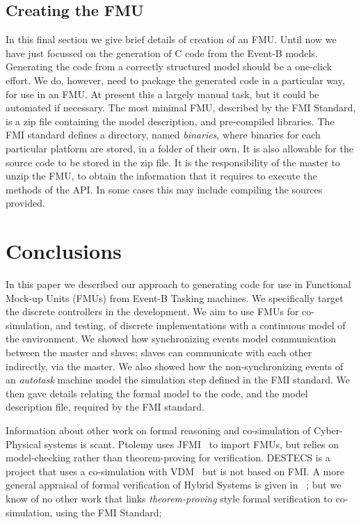 \documentclass{llncs}%
\begin{document}
\subsection{Creating the FMU}    
In this final section we give brief details of creation of an FMU. Until now we have just focussed on the generation of C code from the Event-B models. Generating the code from a correctly  structured model should be a one-click effort. We do, however, need to package the generated code in a particular way, for use in an FMU. At present this a largely manual task, but it could be automated if necessary. The most minimal FMU, described by the FMI Standard, is a zip file containing the model description, and pre-compiled libraries. The FMI standard defines a directory, named  \emph{binaries}, where binaries for each particular platform are stored, in a folder of their own. It is also allowable for the source code to be stored in the zip file. It is the responsibility of the master to unzip the FMU, to obtain the information that it requires to execute the methods of the API. In some cases this may include compiling the sources provided. 
%
\vspace*{-0.3cm}
\section{Conclusions}\label{conclusion}
In this paper we described our approach to generating code for use in Functional Mock-up Units (FMUs) from Event-B Tasking machines. We specifically target the discrete controllers in the development. We aim to use FMUs for co-simulation, and testing, of discrete implementations with a continuous model of the environment. We showed how synchronizing events model communication between the master and slaves; slaves can communicate with each other indirectly, via the master. We also showed how the non-synchronizing events of an \emph{autotask} machine model the simulation step defined in the FMI standard. We then gave details relating the formal model to the code, and the model description file, required by the FMI standard.

Information about other work on formal reasoning and co-simulation of Cyber-Physical systems is scant. Ptolemy uses JFMI~\cite{jfmi} to import FMUs, but relies on model-checking rather than theorem-proving for verification. DESTECS is a project that uses a co-simulation with VDM~\cite{destecs} but is not based on FMI. A more general appraisal of formal verification of Hybrid Systems is given in ~\cite{alur2011formal}; but we know of no other work that links \emph{theorem-proving} style formal verification to co-simulation, using the FMI Standard;    


%
%
%
%
%
%
\end{document}
